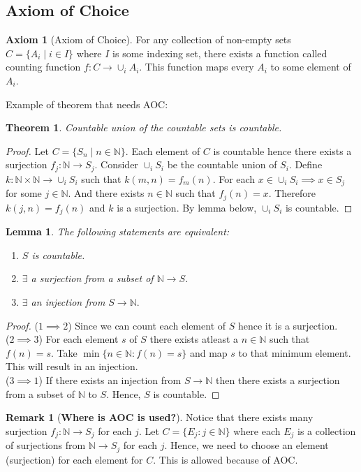 \documentclass[12pt]{report}
\newtheorem{thm}{Theorem}
\newtheorem{lem}{Lemma}
\theoremstyle{definition}
\newtheorem*{rem}{Remark}
\newtheorem{ax}{Axiom}
\newcommand{\N}{\mathbb{N}}
\begin{document}
\subsection*{Axiom of Choice}
\begin{ax}[Axiom of Choice]
    For any collection of non-empty sets $C = \{A_i \mid i \in I\}$ where $I$ is some indexing set, there exists a function called counting function $f : C \to \cup_i A_i$. This function maps every $A_i$ to some element of $A_i$.
\end{ax}
Example of theorem that needs AOC:
\begin{thm}
    Countable union of the countable sets is countable.
\end{thm}
\begin{proof}
    Let $C = \{S_n \mid n \in \N\}$. Each element of $C$ is countable hence there exists a surjection $f_j : \N \to S_j$. Consider $\cup_i S_i$ be the countable union of $S_i$. Define $k : \N \times \N \to \cup_i S_i$ such that $k(m,n) = f_m(n)$. For each $x \in \cup_i S_i \implies x \in S_j$ for some $j \in \N$. And there exists $n \in \N$ such that $f_j(n) = x$. Therefore $k(j,n) = f_j(n)$ and $k$ is a surjection. By lemma below, $\cup_iS_i$ is countable.
\end{proof}
\begin{lem}
    The following statements are equivalent:
    \begin{enumerate}
        \item $S$ is countable.
        \item $\exists$ a surjection from a subset of $\N \to S$.
        \item $\exists$ an injection from $S \to \N.$
    \end{enumerate}
\end{lem}
\begin{proof}
    ($1 \implies 2$) Since we can count each element of $S$ hence it is a surjection.\\
    ($2 \implies 3$) For each element $s$ of $S$ there exists atleast a $n \in \N$ such that $f(n) = s$. Take $\min\{n \in \N : f(n) = s\}$ and map $s$ to that minimum element. This will result in an injection.\\
    ($3 \implies 1$) If there exists an injection from $S \to \N$ then there exists a surjection from a subset of $\N$ to $S$. Hence, $S$ is countable.
\end{proof}
\begin{rem}[\bf Where is AOC is used?]
    Notice that there exists many surjection $f_j : \N \to S_j$ for each $j$. Let $C = \{E_j : j \in \N\}$ where each $E_j$ is a collection of surjections from $\N \to S_j$ for each $j$. Hence, we need to choose an element (surjection) for each element for $C$. This is allowed because of AOC.
\end{rem}
\end{document}
